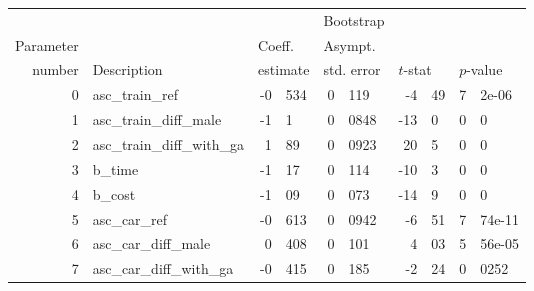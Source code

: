 \documentclass{article}
\begin{document}
\begin{tabular}{rlr@{.}lr@{.}lr@{.}lr@{.}l}
          &              &   \multicolumn{2}{l}{}         & \multicolumn{2}{l}{Bootstrap}  &  \multicolumn{4}{l}{}  \\
Parameter &              &   \multicolumn{2}{l}{Coeff.}   & \multicolumn{2}{l}{Asympt.}       & \multicolumn{4}{l}{}   \\
number    &  Description &   \multicolumn{2}{l}{estimate} & \multicolumn{2}{l}{std. error}    & \multicolumn{2}{l}{$t$-stat}  &  \multicolumn{2}{l}{$p$-value} \\
\hline
0 & asc\_train\_ref & -0&534 & 0&119 & -4&49 & 7&2e-06 \\ 
1 & asc\_train\_diff\_male & -1&1 & 0&0848 & -13&0 & 0&0 \\ 
2 & asc\_train\_diff\_with\_ga & 1&89 & 0&0923 & 20&5 & 0&0 \\ 
3 & b\_time & -1&17 & 0&114 & -10&3 & 0&0 \\ 
4 & b\_cost & -1&09 & 0&073 & -14&9 & 0&0 \\ 
5 & asc\_car\_ref & -0&613 & 0&0942 & -6&51 & 7&74e-11 \\ 
6 & asc\_car\_diff\_male & 0&408 & 0&101 & 4&03 & 5&56e-05 \\ 
7 & asc\_car\_diff\_with\_ga & -0&415 & 0&185 & -2&24 & 0&0252 \\ 

\end{tabular}
\end{document}
